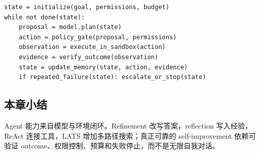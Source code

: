 
\begin{lstlisting}[caption={带验证和权限边界的 agent loop}]
state = initialize(goal, permissions, budget)
while not done(state):
    proposal = model.plan(state)
    action = policy_gate(proposal, permissions)
    observation = execute_in_sandbox(action)
    evidence = verify_outcome(observation)
    state = update_memory(state, action, evidence)
    if repeated_failure(state): escalate_or_stop(state)
\end{lstlisting}

\subsection{本章小结}

Agent 能力来自模型与环境闭环。Refinement 改写答案，reflection 写入经验，ReAct 连接工具，LATS 增加多路径搜索；真正可靠的 self-improvement 依赖可验证 outcome、权限控制、预算和失败停止，而不是无限自我对话。

